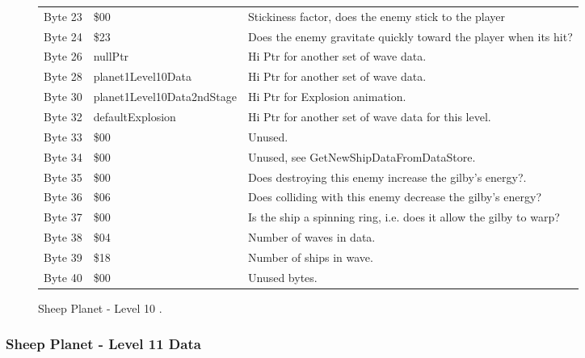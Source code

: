 \begin{figure}[H]
{\begin{adjustbox}{width=12cm}
\begin{tabular}{lll}
 Byte 23 & \$00                        & Stickiness factor, does the enemy stick to the player              \\
 Byte 24 & \$23                        & Does the enemy gravitate quickly toward the player when its hit?   \\
 Byte 26 & nullPtr                    & Hi Ptr for another set of wave data.                               \\
 Byte 28 & planet1Level10Data         & Hi Ptr for another set of wave data.                               \\
 Byte 30 & planet1Level10Data2ndStage & Hi Ptr for Explosion animation.                                    \\
 Byte 32 & defaultExplosion           & Hi Ptr for another set of wave data for this level.                \\
 Byte 33 & \$00                        & Unused.                                                            \\
 Byte 34 & \$00                        & Unused, see GetNewShipDataFromDataStore.                           \\
 Byte 35 & \$00                        & Does destroying this enemy increase the gilby's energy?.           \\
 Byte 36 & \$06                        & Does colliding with this enemy decrease the gilby's energy?        \\
 Byte 37 & \$00                        & Is the ship a spinning ring, i.e. does it allow the gilby to warp? \\
 Byte 38 & \$04                        & Number of waves in data.                                           \\
 Byte 39 & \$18                        & Number of ships in wave.                                           \\
 Byte 40 & \$00                        & Unused bytes.                                                      \\
\bottomrule
\end{tabular}

  \end{adjustbox}

  }\caption*{Sheep Planet - Level 10
.}
\end{figure}

\clearpage
\subsubsection{Sheep Planet - Level 11 Data}


